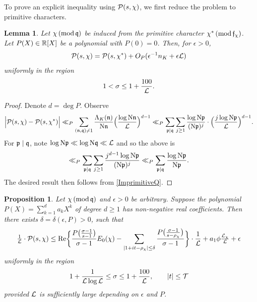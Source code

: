 \documentclass[12pt,psamsfonts]{amsart}
\newtheorem{prop}[thm]{Proposition}
\newtheorem{lem}[thm]{Lemma}
\theoremstyle{definition}
\theoremstyle{remark}
\numberwithin{equation}{section}
\begin{document}
To prove an explicit inequality using $\mathcal{P}(s,\chi)$, we first reduce the problem to primitive characters.
\begin{lem} \label{PolyEI-Imprimitive} Let $\chi \, (\mathrm{mod} {\, \mathfrak{q}})$ be induced from the primitive character $\chi^* \, (\mathrm{mod} {\, \mathfrak{f}_{\chi}})$. Let $P(X) \in \mathbb{R}[X]$ be a polynomial with $P(0) = 0$. Then, for $\epsilon > 0$, 
\[
\mathcal{P}(s,\chi) = \mathcal{P}(s, \chi^*) + O_P( \epsilon^{-1} n_K + \epsilon \mathcal{L})
\]
uniformly in the region 
\[
1 < \sigma \leq 1 + \frac{100}{\mathcal{L}}. 
\]
\end{lem}
\begin{proof} Denote $d = \deg P$. Observe
\[
 \Big| \mathcal{P}(s,\chi) -  \mathcal{P}(s,\chi^*)\Big| 
 	\ll_P \sum_{ (\mathfrak{n},\mathfrak{q}) \neq 1}\frac{\Lambda_K(\mathfrak{n})}{\mathrm{N}\mathfrak{n}} \Big( \frac{\log \mathrm{N}\mathfrak{n}}{\mathcal{L}} \Big)^{d-1}  
	\ll_{P} \sum_{ \mathfrak{p} \mid \mathfrak{q}} \sum_{j \geq 1} \frac{\log \mathrm{N}\mathfrak{p}}{(\mathrm{N}\mathfrak{p})^{j}} \cdot \Big( \frac{j \log \mathrm{N}\mathfrak{p}}{\mathcal{L}} \Big)^{d-1}.  
\]
For $\mathfrak{p} \mid \mathfrak{q}$, note $\log \mathrm{N}\mathfrak{p} \ll \log \mathrm{N}\mathfrak{q} \ll \mathcal{L}$ and so the above is
\[
\ll_{P} \sum_{ \mathfrak{p} \mid \mathfrak{q}} \sum_{j \geq 1}  \frac{j^{d-1}\log \mathrm{N}\mathfrak{p}}{(\mathrm{N}\mathfrak{p})^{j}}  \ll_{P} \sum_{\mathfrak{p} \mid \mathfrak{q}} \frac{\log \mathrm{N}\mathfrak{p}}{\mathrm{N}\mathfrak{p}}. 
\]
The desired result then follows from \cref{ImprimitiveQ}. 
\end{proof}
\begin{prop} \label{PolyEI} Let $\chi \, (\mathrm{mod} {\, \mathfrak{q}})$ and $\epsilon > 0$ be arbitrary. Suppose the polynomial $P(X) = \sum_{k=1}^d a_k X^k$
of degree $d \geq 1$ has non-negative real coefficients. Then there exists $\delta = \delta(\epsilon,P) > 0$, such that 
\begin{equation}
\tfrac{1}{\mathcal{L}}  \cdot \mathcal{P}(s, \chi)  \leq  \mathrm{Re}\bigg\{ \frac{ P\big( \frac{\sigma-1}{s-1}\big)}{\sigma-1} E_0(\chi) -  \sum_{|1+it-\rho_{\chi}| \leq \delta} \frac{P\big( \frac{\sigma-1}{s-\rho_{\chi}} \big)}{\sigma-1} \bigg\} \cdot \frac{1}{\mathcal{L}} + a_1 \phi \tfrac{\mathcal{L}_{\chi}}{\mathcal{L}}  + \epsilon 
\label{PolyEI-Inequality}
\end{equation}
uniformly in the region
\[
1 + \frac{1}{\mathcal{L} \log \mathcal{L}} \leq \sigma \leq 1+\frac{100}{\mathcal{L}}, \qquad |t| \leq \mathcal{T}
\]
provided $\mathcal{L}$ is sufficiently large depending on $\epsilon$ and $P$. 
\end{prop}
\end{document}
